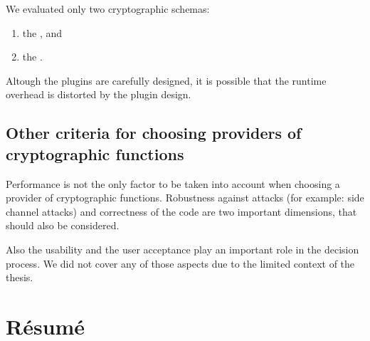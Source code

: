 We evaluated only two cryptographic schemas:
\begin{enumerate}
\item the \crypto, and
\item the \fcrypt.
\end{enumerate}

Altough the plugins are carefully designed, it is possible that the runtime overhead is distorted by the plugin design.

	\subsection{Other criteria for choosing providers of cryptographic functions}

Performance is not the only factor to be taken into account when choosing a provider of cryptographic functions.
Robustness against attacks (for example: side channel attacks) and correctness of the code are two important dimensions, that should also be considered.

Also the usability and the user acceptance play an important role in the decision process.
We did not cover any of those aspects due to the limited context of the thesis.

\section{Résumé}


